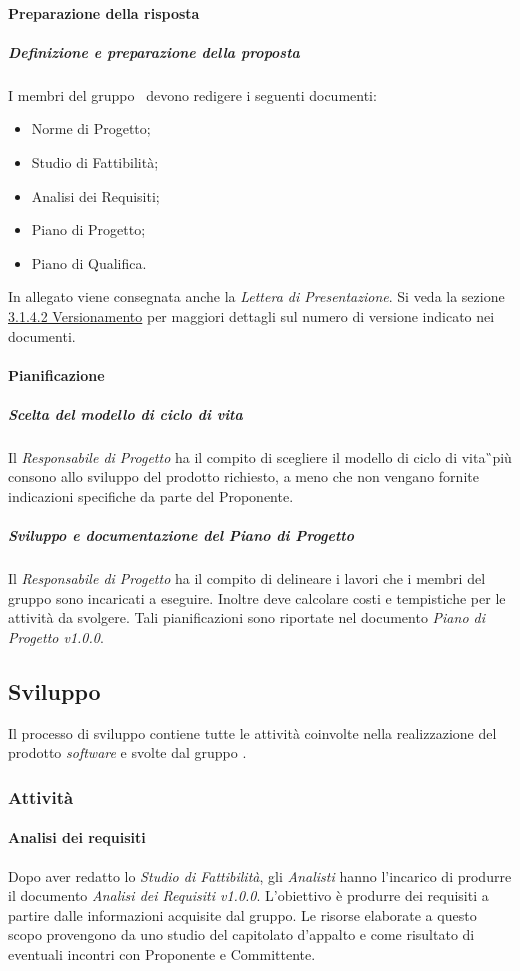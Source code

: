 \paragraph{Preparazione della risposta}
\subparagraph{Definizione e preparazione della proposta}
I membri del gruppo \GRUPPO\ devono redigere i seguenti documenti:
\begin{itemize}
	\item{Norme di Progetto;}
	\item{Studio di Fattibilità;}
	\item{Analisi dei Requisiti;}
	\item{Piano di Progetto;}
	\item{Piano di Qualifica.}
\end{itemize}
In allegato viene consegnata anche la \textit{Lettera di Presentazione}. Si veda la sezione \hyperref[sec:versionamento]{3.1.4.2 Versionamento} per maggiori dettagli sul numero di versione indicato nei documenti.

\paragraph{Pianificazione}
\subparagraph{Scelta del modello di ciclo di vita}
Il \textit{Responsabile di Progetto} ha il compito di scegliere il modello di ciclo di vita\G\ più consono allo sviluppo del prodotto richiesto, a meno che non vengano fornite indicazioni specifiche da parte del Proponente.
\subparagraph{Sviluppo e documentazione del Piano di Progetto}
Il \textit{Responsabile di Progetto} ha il compito di delineare i lavori che i membri del gruppo sono incaricati a eseguire. Inoltre deve calcolare costi e tempistiche per le attività da svolgere. Tali pianificazioni sono riportate nel documento \textit{Piano di Progetto v1.0.0}.

\subsection{Sviluppo}
Il processo di sviluppo contiene tutte le attività coinvolte nella realizzazione del prodotto \textit{software} e svolte dal gruppo \GRUPPO.

\subsubsection{Attività}
\paragraph{Analisi dei requisiti}
Dopo aver redatto lo \textit{Studio di Fattibilità}, gli \textit{Analisti} hanno l'incarico di produrre il documento \textit{Analisi dei Requisiti v1.0.0}. L'obiettivo è produrre dei requisiti a partire dalle informazioni acquisite dal gruppo.
Le risorse elaborate a questo scopo provengono da uno studio del capitolato d'appalto e come risultato di eventuali incontri con Proponente e Committente.

